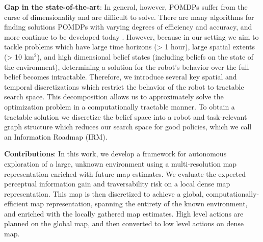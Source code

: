 \documentclass{article}
\newcommand{\ph}[1]{{\textbf{#1}:}} %
\begin{document}



\ph{Gap in the state-of-the-art}
In general, however, POMDPs suffer from the curse of dimensionality and are difficult to solve.  There are many algorithms for finding solutions POMDPs with varying degrees of efficiency and accuracy, and more continue to be developed today \cite{silver2010monte,somani2013despot,bonet1998learning,kim2019pomhdp}.  However, because in our setting we aim to tackle problems which have large time horizons (> 1 hour), large spatial extents (> 10 km$^2$), and high dimensional belief states (including beliefs on the state of the environment), determining a solution for the robot's behavior over the full belief becomes intractable.  Therefore, we introduce several key spatial and temporal discretizations which restrict the behavior of the robot to tractable search space.  This decomposition allows us to approximately solve the optimization problem in a computationally tractable manner.
%
To obtain a tractable solution we discretize the belief space into a robot and task-relevant graph structure which reduces our search space for good policies, which we call an Information Roadmap (IRM).

\ph{Contributions}
In this work, we develop a framework for autonomous exploration of a large, unknown environment using a multi-resolution map representation enriched with future map estimates. We evaluate the expected perceptual information gain and traversability risk on a local dense map representation. This map is then discretized to achieve a global, computationally-efficient map representation, spanning the entirety of the known environment, and enriched with the locally gathered map estimates. High level actions are planned on the global map, and then converted to low level actions on dense map.    
\end{document}
